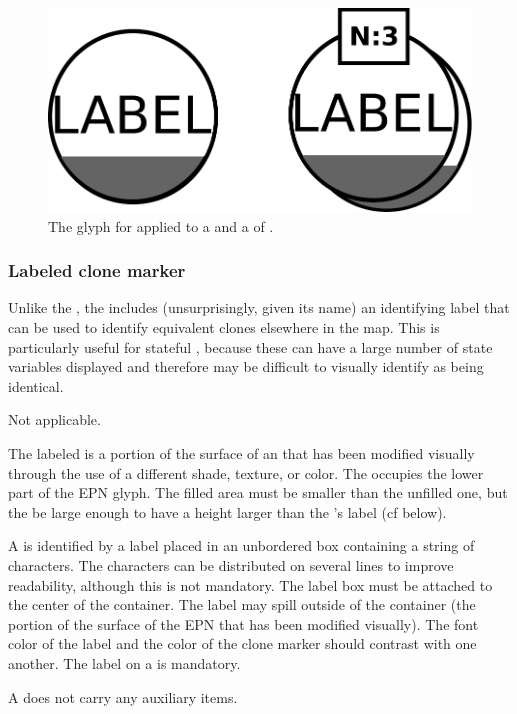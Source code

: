\begin{figure}[H]
  \centering
  \includegraphics[scale = 0.3]{images/simpleCloneMarker}
  \caption{The \PD glyph for  applied to a  and a  of .}
  \label{fig:simpleCloneMarker}
\end{figure}


\subsubsection{Labeled clone marker}

Unlike the , the  includes (unsurprisingly, given its name) an identifying label that can be used to identify equivalent clones elsewhere in the map.  This is particularly useful for stateful , because these can have a large number of state variables displayed and therefore may be difficult to visually identify as being identical.

\begin{glyphDescription}

\glyphSboTerm Not applicable.

\glyphContainer The labeled  is a portion of the surface of an  that has been modified visually through the use of a different shade, texture, or color.  The  occupies the lower part of the EPN glyph. The filled area must be smaller than the unfilled one, but the be large enough to have a height larger than the 's label (cf below).  

\glyphLabel A  is identified by a label placed in an unbordered box containing a string of characters.  The characters can be distributed on several lines to improve readability, although this is not mandatory.  The label box must be attached to the center of the container.  The label may spill outside of the container (the portion of the surface of the EPN that has been modified visually).  The font color of the label and the color of the clone marker should contrast with one another.  The label on a  is mandatory.

\glyphAux A  does not carry any auxiliary items.

\end{glyphDescription}

